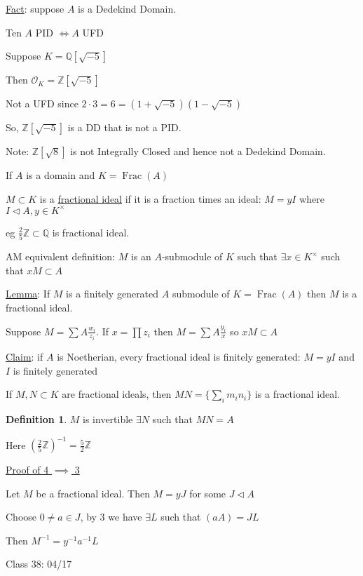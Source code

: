 \documentclass{article}
\theoremstyle{definition}
\newtheorem{definition}{Definition}
\newcommand{\Frac}{\operatorname{Frac}}
\begin{document}
\underline{Fact}: suppose \(A\) is a Dedekind Domain.

Ten \(A\) PID \(\iff A\) UFD

Suppose \(K = \mathbb{Q}[\sqrt{-5}]\)

Then \(\mathcal{O}_K = \mathbb{Z} [\sqrt{-5}]\) 

Not a UFD since \(2\cdot 3 = 6 = (1+\sqrt{-5})(1-\sqrt{-5})\) 

So, \(\mathbb{Z}[\sqrt{-5}]\) is a DD that is not a PID.

Note: \(\mathbb{Z}[\sqrt{8}]\) is not Integrally Closed and hence not a Dedekind Domain.

If \(A\) is a domain and \(K = \Frac(A)\)

\(M \subset K\) is a \underline{fractional ideal} if it is a fraction times an ideal: \(M = yI\) where \(I \triangleleft A, y\in K^\times\)  

eg \(\frac{2}{5}\mathbb{Z} \subset \mathbb{Q}\) is fractional ideal.

AM equivalent definition: \(M\) is an \(A\)-submodule of \(K\) such that \(\exists x\in K^\times\) such that \(xM \subset A\)  

\underline{Lemma}: If \(M\) is a finitely generated \(A\) submodule of \(K = \Frac(A)\) then \(M\) is a fractional ideal.

Suppose \(M = \sum A \frac{w_i}{z_i}\). If \(x = \prod z_i\) then \(M = \sum A \frac{y_i}{x}\) so \(xM \subset A\)   

\underline{Claim}: if \(A\) is Noetherian, every fractional ideal is finitely generated: \(M = y I\) and \(I\) is finitely generated

If \(M,N \subset K\) are fractional ideals, then \(MN = \{ \sum_{i} m_i n_i \} \) is a fractional ideal.

\begin{definition}
    \(M\) is invertible \(\exists N\) such that \(MN=A\)  
\end{definition}

Here \(\left( \frac{2}{5}\mathbb{Z} \right) ^{-1} = \frac{5}{2}\mathbb{Z} \) 

\underline{Proof of 4 \(\implies\) 3}

Let \(M\) be a fractional ideal. Then \(M = yJ\) for some \(J \triangleleft A\)

Choose \(0\neq a\in J\), by 3 we have \(\exists L\) such that \((aA)=JL\)

Then \(M ^{-1} = y^{-1} a^{-1} L\) 

\hrulefill Class 38: 04/17
\end{document}
